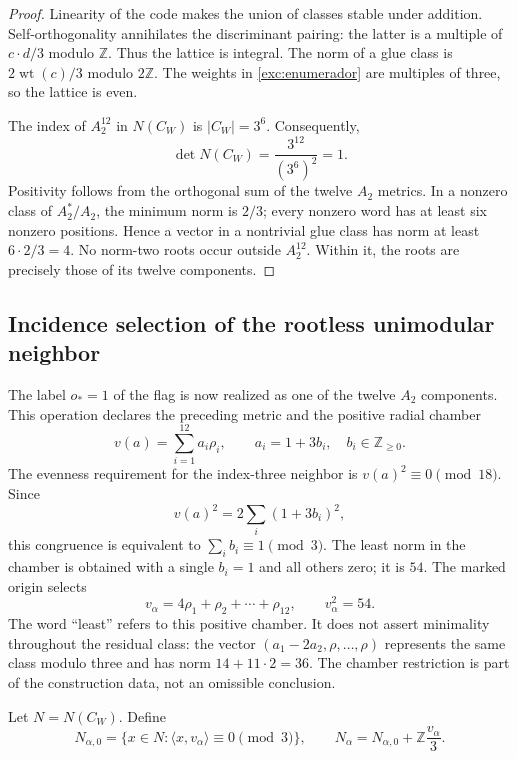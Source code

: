 \begin{proof}
Linearity of the code makes the union of classes stable under
addition. Self-orthogonality annihilates the discriminant pairing:
the latter is a multiple of $c\cdot d/3$ modulo $\mathbb Z$. Thus the
lattice is integral. The norm of a glue class is
$2\operatorname{wt}(c)/3$ modulo $2\mathbb Z$. The weights in
\eqref{exc:enumerador} are multiples of three, so the lattice is even.

The index of $A_2^{12}$ in $N(C_W)$ is $|C_W|=3^6$. Consequently,
\[
 \det N(C_W)=\frac{3^{12}}{(3^6)^2}=1.
\]
Positivity follows from the orthogonal sum of the twelve $A_2$ metrics.
In a nonzero class of $A_2^*/A_2$, the minimum norm is $2/3$;
every nonzero word has at least six nonzero positions.
Hence a vector in a nontrivial glue class has norm
at least $6\cdot2/3=4$. No norm-two roots occur outside
$A_2^{12}$. Within it, the roots are precisely those of its
twelve components.
\end{proof}

\subsection{Incidence selection of the rootless unimodular neighbor}
\label{exc:leech}



The label $o_*=1$ of the flag is now realized as one of the
twelve $A_2$ components. This operation declares the preceding metric and
the positive radial chamber
\[
 v(a)=\sum_{i=1}^{12}a_i\rho_i,
 \qquad a_i=1+3b_i,\quad b_i\in\mathbb Z_{\geq0}.
\]
The evenness requirement for the index-three neighbor is
$v(a)^2\equiv0\pmod{18}$. Since
\[
 v(a)^2=2\sum_i(1+3b_i)^2,
\]
this congruence is equivalent to $\sum_i b_i\equiv1\pmod3$. The least
norm in the chamber is obtained with a single $b_i=1$ and
all others zero; it is $54$. The marked origin selects
\begin{equation}
 v_\alpha=4\rho_1+\rho_2+\cdots+\rho_{12},
 \qquad v_\alpha^2=54.
 \label{exc:vector}
\end{equation}
The word ``least'' refers to this positive chamber. It does not assert
minimality throughout the residual class: the vector
$(a_1-2a_2,\rho,\ldots,\rho)$ represents the same class modulo three
and has norm $14+11\cdot2=36$. The chamber restriction is part
of the construction data, not an omissible conclusion.

Let $N=N(C_W)$. Define
\begin{equation}
 N_{\alpha,0}=\{x\in N:\langle x,v_\alpha\rangle\equiv0\pmod3\},
 \qquad
 N_\alpha=N_{\alpha,0}+\mathbb Z\frac{v_\alpha}{3}.
 \label{exc:vecino}
\end{equation}

